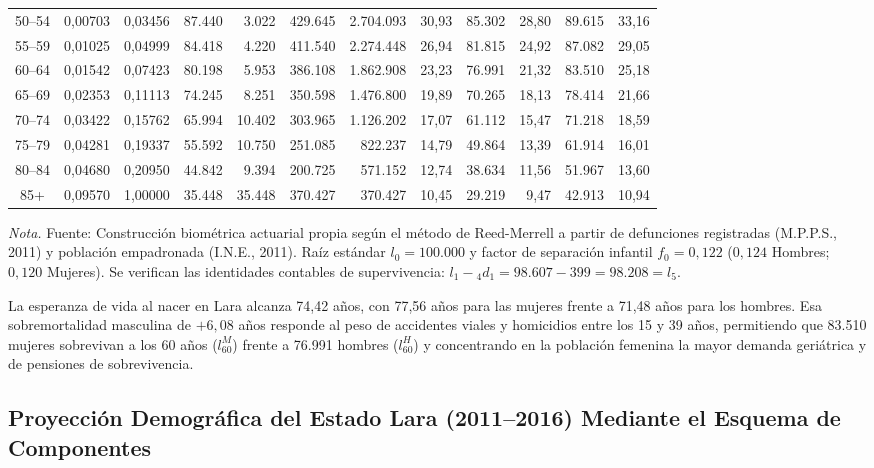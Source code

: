 \documentclass[12pt,letterpaper]{article}
\begin{document}
\begin{table}[htbp]
\begin{tabular*}{\textwidth}{@{\extracolsep{\fill}}crrrrrrrrrrr}
        50--54 & 0,00703 & 0,03456 & 87.440 & 3.022 & 429.645 & 2.704.093 & 30,93 & 85.302 & 28,80 & 89.615 & 33,16 \\
        55--59 & 0,01025 & 0,04999 & 84.418 & 4.220 & 411.540 & 2.274.448 & 26,94 & 81.815 & 24,92 & 87.082 & 29,05 \\
        60--64 & 0,01542 & 0,07423 & 80.198 & 5.953 & 386.108 & 1.862.908 & 23,23 & 76.991 & 21,32 & 83.510 & 25,18 \\
        65--69 & 0,02353 & 0,11113 & 74.245 & 8.251 & 350.598 & 1.476.800 & 19,89 & 70.265 & 18,13 & 78.414 & 21,66 \\
        70--74 & 0,03422 & 0,15762 & 65.994 & 10.402 & 303.965 & 1.126.202 & 17,07 & 61.112 & 15,47 & 71.218 & 18,59 \\
        75--79 & 0,04281 & 0,19337 & 55.592 & 10.750 & 251.085 & 822.237 & 14,79 & 49.864 & 13,39 & 61.914 & 16,01 \\
        80--84 & 0,04680 & 0,20950 & 44.842 & 9.394 & 200.725 & 571.152 & 12,74 & 38.634 & 11,56 & 51.967 & 13,60 \\
        85+ & 0,09570 & 1,00000 & 35.448 & 35.448 & 370.427 & 370.427 & 10,45 & 29.219 & 9,47 & 42.913 & 10,94 \\
        \bottomrule
    \end{tabular*}
    \par\vspace{2pt}\noindent\raggedright \scriptsize \textit{Nota.} Fuente: Construcción biométrica actuarial propia según el método de Reed-Merrell a partir de defunciones registradas (M.P.P.S., 2011) y población empadronada (I.N.E., 2011). Raíz estándar $l_0 = 100.000$ y factor de separación infantil $f_0 = 0,122$ ($0,124$ Hombres; $0,120$ Mujeres). Se verifican las identidades contables de supervivencia: $l_1 - {}_4 d_1 = 98.607 - 399 = 98.208 = l_5$.
\end{table}

La esperanza de vida al nacer en Lara alcanza 74,42 años, con 77,56 años para las mujeres frente a 71,48 años para los hombres. Esa sobremortalidad masculina de $+6,08$ años responde al peso de accidentes viales y homicidios entre los 15 y 39 años, permitiendo que 83.510 mujeres sobrevivan a los 60 años ($l_{60}^M$) frente a 76.991 hombres ($l_{60}^H$) y concentrando en la población femenina la mayor demanda geriátrica y de pensiones de sobrevivencia.

\subsection{Proyección Demográfica del Estado Lara (2011--2016) Mediante el Esquema de Componentes}
\end{document}
